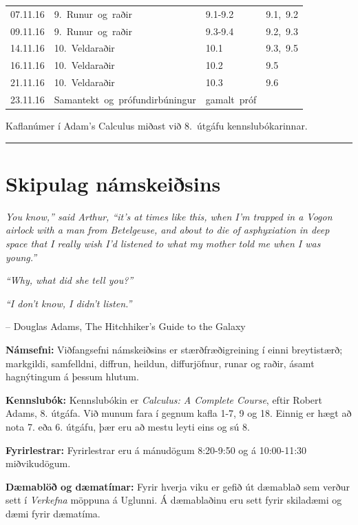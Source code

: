 \documentclass[a4paper,10pt,icelandic]{sphinxmanual}
\begin{document}
\begin{longtable}{c|l|l|l}
\hline

07.11.16&
9.~Runur~og~raðir&
9.1-9.2&
9.1,~9.2\\
09.11.16&
9.~Runur~og~raðir&
9.3-9.4&
9.2,~9.3\\

\hline

14.11.16&
10.~Veldaraðir&
10.1&
9.3,~9.5\\
16.11.16&
10.~Veldaraðir&
10.2&
9.5\\

\hline

21.11.16&
10.~Veldaraðir&
10.3&
9.6\\
23.11.16&
Samantekt~og~prófundirbúningur&
gamalt~próf&
\\
\hline
\end{longtable}


Kaflanúmer í Adam’s Calculus miðast við 8. útgáfu kennslubókarinnar.


\bigskip\hrule{}\bigskip

\newpage
 
\section{Skipulag námskeiðsins}
\label{vidauki:skipulag-namskeisins}
\emph{You know,'' said Arthur, ``it's at times like this, when I'm trapped in a
Vogon airlock with a man from Betelgeuse, and about to die of asphyxiation
in deep space that I really wish I'd listened to what my mother told me when I was young.''}

\emph{``Why, what did she tell you?''}

\emph{``I don't know, I didn't listen.”}

-- Douglas Adams, The Hitchhiker's Guide to the Galaxy

\textbf{Námsefni:} Viðfangsefni námskeiðsins er stærðfræðigreining í einni
breytistærð; markgildi, samfelldni, diffrun, heildun, diffurjöfnur,
runar og raðir, ásamt hagnýtingum á þessum hlutum.

\textbf{Kennslubók:} Kennslubókin er \emph{Calculus: A Complete Course}, eftir
Robert Adams, 8. útgáfa. Við munum fara í gegnum kafla 1-7, 9 og
18. Einnig er hægt að nota 7. eða 6. útgáfu, þær eru að mestu leyti eins og sú 8.

\textbf{Fyrirlestrar:} Fyrirlestrar eru á mánudögum 8:20-9:50 og á
10:00-11:30 miðvikudögum.

\textbf{Dæmablöð og dæmatímar:} Fyrir hverja viku er gefið út dæmablað sem
verður sett í \emph{Verkefna} möppuna á Uglunni. Á dæmablaðinu eru sett fyrir
skiladæmi og dæmi fyrir dæmatíma.
\end{document}
